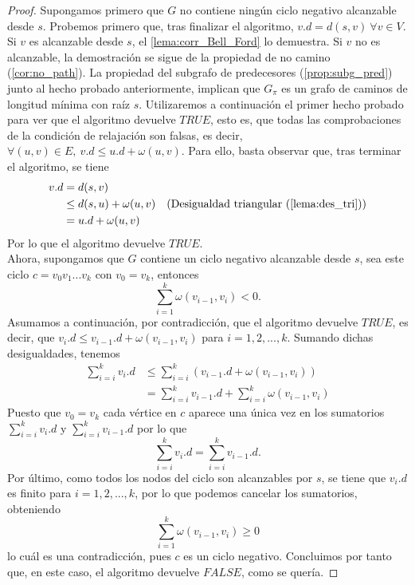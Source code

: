 \begin{proof}
	Supongamos primero que $G$ no contiene ningún ciclo negativo alcanzable desde $s$. Probemos primero que, tras finalizar el algoritmo, $v.d=d(s,v)\ \forall v\in V$. Si $v$ es alcanzable desde $s$, el \autoref{lema:corr_Bell_Ford} lo demuestra. Si $v$ no es alcanzable, la demostración se sigue de la propiedad de no camino (\autoref{cor:no_path}). La propiedad del subgrafo de predecesores (\autoref{prop:subg_pred}) junto al hecho probado anteriormente, implican que $G_{\pi}$ es un grafo de caminos de longitud mínima con raíz $s$. Utilizaremos a continuación el primer hecho probado para ver que el algoritmo devuelve $TRUE$, esto es, que todas las comprobaciones de la condición de relajación son falsas, es decir, $\forall (u,v)\in E,\ v.d\leq u.d+\omega(u,v)$. Para ello, basta observar que, tras terminar el algoritmo, se tiene
	\begin{align*}
		v.d & = d(s,v) \\
		& \leq d(s,u) + \omega(u,v) & (\textrm{Desigualdad triangular (\autoref{lema:des_tri})}) \\
		& = u.d + \omega(u,v)
	\end{align*}
	Por lo que el algoritmo devuelve $TRUE$. \\
	Ahora, supongamos que $G$ contiene un ciclo negativo alcanzable desde $s$, sea este ciclo $c=v_0v_1...v_k$ con $v_0=v_k$, entonces
	$$\sum_{i=1}^{k}\omega(v_{i-1},v_i)<0.$$
	Asumamos a continuación, por contradicción, que el algoritmo devuelve $TRUE$, es decir, que $v_i.d\leq v_{i-1}.d+\omega(v_{i-1},v_i)$ para $i=1,2,...,k$. Sumando dichas desigualdades, tenemos
	\begin{align*}
		\sum_{i=i}^{k}v_i.d &\leq \sum_{i=i}^{k}(v_{i-1}.d+\omega(v_{i-1},v_i)) \\
		& = \sum_{i=i}^{k}v_{i-1}.d+\sum_{i=i}^{k}\omega(v_{i-1},v_i)
	\end{align*}
	Puesto que $v_0=v_k$ cada vértice en $c$ aparece una única vez en los sumatorios $\sum_{i=i}^{k}v_i.d$ y $\sum_{i=i}^{k}v_{i-1}.d$ por lo que
	$$\sum_{i=i}^{k}v_i.d = \sum_{i=i}^{k}v_{i-1}.d.$$
	Por último, como todos los nodos del ciclo son alcanzables por $s$, se tiene que $v_i.d$ es finito para $i=1,2,...,k$, por lo que podemos cancelar los sumatorios, obteniendo
	$$\sum_{i=1}^{k}\omega(v_{i-1},v_i)\geq 0$$
	lo cuál es una contradicción, pues $c$ es un ciclo negativo. Concluimos por tanto que, en este caso, el algoritmo devuelve $FALSE$, como se quería.
\end{proof}

